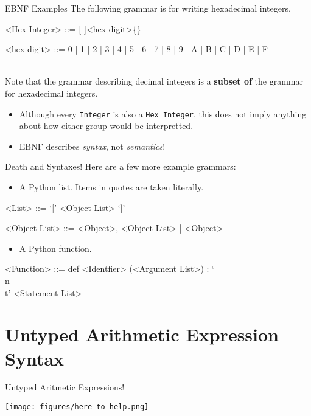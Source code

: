\documentclass[11pt]{beamer}
\begin{document}
\begin{frame}[fragile=singleslide]{EBNF Examples}
The following grammar is for writing hexadecimal integers. \\
\dotfill
\begin{grammar}
<Hex Integer> ::= [-]<hex digit>\{<hex digit>\}

<hex digit> ::= 0 | 1 | 2 | 3 | 4 | 5 | 6 | 7 | 8 | 9 | A | B | C | D | E | F
\end{grammar}
\dotfill \\
Note that the grammar describing decimal integers is a \textbf{subset of} the grammar for hexadecimal integers.  
\begin{itemize}
\item Although every \texttt{Integer} is also a \texttt{Hex Integer}, this does not imply anything about how either group would be interpretted.  
\item EBNF describes \emph{syntax}, not \emph{semantics}!
\end{itemize}
\end{frame}

\begin{frame}[fragile=singleslide]{Death and Syntaxes!}
Here are a few more example grammars:
\begin{itemize}
\item A Python list.  Items in quotes are taken literally.
\end{itemize}
\dotfill
\begin{grammar}
<List> ::= `[' <Object List> `]'

<Object List> ::= <Object>, <Object List> | <Object>
\end{grammar}
\dotfill
\begin{itemize}
\item A Python function.  
\end{itemize}
\dotfill
\begin{grammar}
<Function> ::= def <Identfier> (<Argument List>) : `\\n\\t' <Statement List>
\end{grammar}
\dotfill
\end{frame}

\section[UAE Syntax]{Untyped Arithmetic Expression Syntax}
\begin{frame}{Untyped Aritmetic Expressions!}
\begin{center}
\texttt{[image: figures/here-to-help.png]}
\end{center}
\end{frame}
\end{document}
